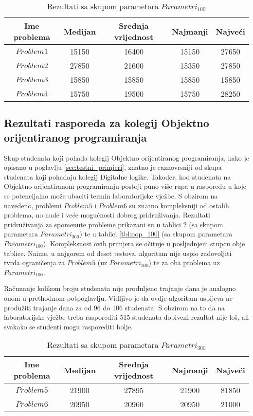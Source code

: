 \documentclass[times, utf8, zavrsni]{fer}
\begin{document}
\begin{table}
  \caption{Rezultati sa skupom parametara $Parametri_{100}$}
  \label{tbl:diglog_100}
  \centering
  \begin{tabular}{c | c | c | c | c   }
    Ime problema &  Medijan & Srednja vrijednost & Najmanji & Najveći \\ \hline
    $Problem1$ &  15150 & 16400 & 15150 & 27650 \\ \hline
    $Problem2$ &  27850 & 21600 & 15350 & 27850 \\ \hline
    $Problem3$ &  15850 & 15850 & 15850 & 15850 \\ \hline
    $Problem4$ &  15750 & 19500 & 15750 & 28250
  \end{tabular}
\end{table}


\subsection{Rezultati rasporeda za kolegij Objektno orijentiranog programiranja}
Skup studenata koji pohađa kolegij Objektno orijentiranog programiranja, kako je opisano u poglavlju \ref{sec:testni_primjeri}, znatno je raznovrsniji od skupa studenata
koji pohađaju kolegij Digitalne logike. Također, kod studenata na Objektno orijentiranom programiranju postoji puno više rupa u rasporedu u koje se potencijalno može
ubaciti termin laboratorijske vježbe. S obzirom na navedeno, problemi $Problem5$ i $Problem6$ su znatno kompleksniji od ostalih problema, no nude i veće mogućnosti
dobrog pridruživanja. Rezultati pridruživanja za spomenute probleme prikazani su u tablici \ref{tbl:oop_300} (sa skupom parametara $Parametri_{300}$) te u tablici
\ref{tbl:oop_100} (sa skupom parametara $Parametri_{100}$). Kompleksnost ovih primjera se očituje u posljednjem stupcu obje tablice. Naime, u najgorem od deset testova,
algoritam nije uspio zadovoljiti tvrda ograničenja za $Problem5$ (uz $Parametri_{300}$) te za oba problema uz $Parametri_{100}$.

Računanje kolikom broju studenata nije produljeno trajanje dana je analogno onom u prethodnom potpoglavlju. Vidljivo je da ovdje algoritam uspijeva ne produžiti trajanje dana
za od 96 do 106 studenata. S obzirom na to da na laboratorijske vježbe treba rasporediti 515 studenata dobiveni rezultat nije loš, ali svakako se studenti mogu rasporediti bolje.

\begin{table}
  \caption{Rezultati sa skupom parametara $Parametri_{300}$}
  \label{tbl:oop_300}
  \centering
  \begin{tabular}{c | c | c | c | c }
    Ime problema &  Medijan & Srednja vrijednost & Najmanji & Najveći \\ \hline
    $Problem5$ & 21900 & 27895 & 21900 & 81850 \\ \hline
    $Problem6$ & 20950 & 20960 & 20950 & 21000
  \end{tabular}
\end{table}
\end{document}
